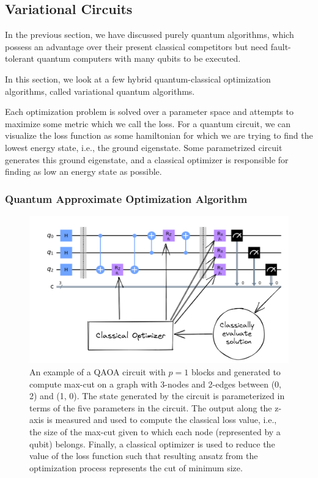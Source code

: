 \subsection{Variational Circuits}
\label{sec:variational-circuits}

In the previous section, we have discussed purely quantum algorithms, which possess an advantage over their present classical competitors but need fault-tolerant quantum computers with many qubits to be executed.

In this section, we look at a few hybrid quantum-classical optimization algorithms, called variational quantum algorithms. 

Each optimization problem is solved over a parameter space and attempts to maximize some metric which we call the loss. For a quantum circuit, we can visualize the loss function as some hamiltonian for which we are trying to find the lowest energy state, i.e., the ground eigenstate. Some parametrized circuit generates this ground eigenstate, and a classical optimizer is responsible for finding as low an energy state as possible.

\subsubsection{Quantum Approximate Optimization Algorithm}
\label{sec:variational-circuits-qaoa}

\begin{figure}[ht]
    \centering
    \includegraphics[width=0.7\linewidth]{figures/intro/qaoa-optimization.png}
    \caption[Variational Circuit for QAOA]{An example of a QAOA circuit with $p = 1$ blocks and generated to compute max-cut on a graph with 3-nodes and 2-edges between (0, 2) and (1, 0). The state generated by the circuit is parameterized in terms of the five parameters in the circuit. The output along the z-axis is measured and used to compute the classical loss value, i.e., the size of the max-cut given to which each node (represented by a qubit) belongs. Finally, a classical optimizer is used to reduce the value of the loss function such that resulting ansatz from the optimization process represents the cut of minimum size.}
    \label{fig:circuit-for-qaoa}
\end{figure}

